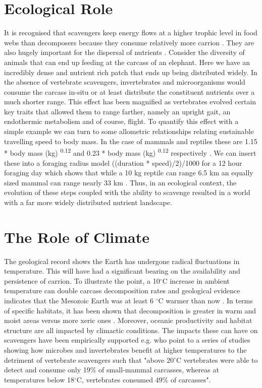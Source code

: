 \documentclass[a4paper,12pt]{article}
\begin{document}
\section*{Ecological Role}
It is recognised that scavengers keep energy flows at a higher trophic level in food webs than decomposers because they consume relatively more carrion \citep{devault2003scavenging}. They are also hugely important for the dispersal of nutrients \citep{beasley2015vertebrates}. Consider the diversity of animals that can end up feeding at the carcass of an elephant. Here we have an incredibly dense and nutrient rich patch that ends up being distributed widely. In the absence of vertebrate scavengers, invertebrates and microorganisms would consume the carcass in-situ or at least distribute the constituent nutrients over a much shorter range. This effect has been magnified as vertebrates evolved certain key traits that allowed them to range farther, namely an upright gait, an endothermic metabolism and of course, flight. To quantify this effect with a simple example we can turn to some allometric relationships relating sustainable travelling speed to body mass. In the case of mammals and reptiles these are 1.15 * body mass (kg) \textsuperscript{0.12} and 0.23 * body mass (kg) \textsuperscript{0.12}
respectively \citep{ruxton2004obligate}. We can insert these into a foraging radius model ((duration * speed)/2)/1000 for a 12 hour foraging day which shows that while a 10 kg reptile can range 6.5 km an equally sized mammal can range nearly 33 km \citep{Enstipp2006Energetics}. Thus, in an ecological context, the evolution of these steps coupled with the ability to scavenge resulted in a world with a far more widely distributed nutrient landscape. 

\section*{The Role of Climate}
The geological record shows the Earth has undergone radical fluctuations in temperature. This will have had a significant bearing on the availability and persistence of carrion. To illustrate the point, a 10$^{\circ}$C increase in ambient temperature can double carcass decomposition rates \citep{parmenter2009carrion} and geological evidence indicates that the Mesozoic Earth was at least 6 $^{\circ}$C warmer than now \citep{sellwood2006mesozoic}. In terms of specific habitats, it has been shown that decomposition is greater in warm and moist areas versus more xeric ones \citep{beasley2015vertebrates}. Moreover, oceanic productivity and habitat structure are all impacted by climactic conditions. The impacts these can have on scavengers have been empirically supported e.g. \cite{beasley2015vertebrates} who point to a series of studies showing how microbes and invertebrates benefit at higher temperatures to the detriment of vertebrate scavengers such that "above 20$^{\circ}$C vertebrates were able to detect and consume only 19\% of small-mammal carcasses, whereas at temperatures below 18$^{\circ}$C, vertebrates consumed 49\% of carcasses". 
\end{document}
